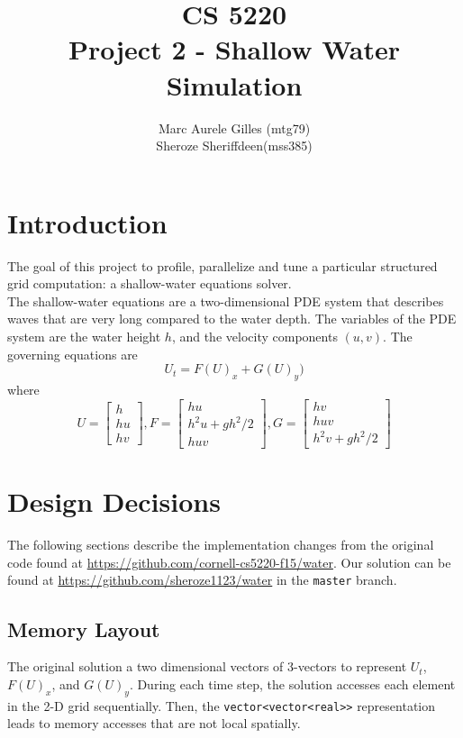 \documentclass[11pt]{article}
\begin{document}
\title{CS 5220\\ Project 2 - Shallow Water Simulation}
\author{Marc Aurele Gilles (mtg79)\\ Sheroze Sheriffdeen(mss385)}
\maketitle

\section{Introduction}

The goal of this project to profile, parallelize and tune a particular structured grid computation: a shallow-water equations solver.  \\

The shallow-water equations are a two-dimensional PDE system that describes waves that are very long compared to the water depth. The variables of the PDE system are the water height $h$, and the velocity components $(u,v)$. The governing equations are \\

$$U_t = F(U)_x + G(U)_y)$$
where 
$$U = \begin{bmatrix}
h \\
hu \\
hv
\end{bmatrix}
,
F = \begin{bmatrix}
hu \\
h^2u+gh^2/2 \\
huv
\end{bmatrix}
,
G=
\begin{bmatrix}
hv \\
huv \\
h^2v+gh^2/2
\end{bmatrix}
$$


\section{Design Decisions}

The following sections describe the implementation changes from the original code found at \url{https://github.com/cornell-cs5220-f15/water}. Our solution can be found at \url{https://github.com/sheroze1123/water} in the \texttt{master} branch. 

\subsection{Memory Layout}
The original solution a two dimensional vectors of 3-vectors to represent $U_t$, $F(U)_x$, and $G(U)_y$. During each time step, the solution accesses each element in the 2-D grid sequentially. Then, the \texttt{vector<vector<real>>} representation leads to memory accesses that are not local spatially. \\
\end{document}
